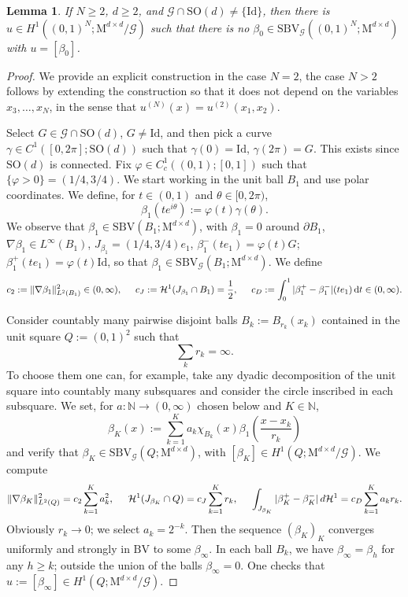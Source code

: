 \documentclass[a4paper,reqno]{amsart}
\newcommand\N{\mathbb{N}}
\newcommand{\BV}{\mathrm{BV}}
\newcommand{\SBV}{\mathrm{SBV}}
\newcommand{\SBVG}{\mathrm{SBV}_{\mathcal{G}}}
\newcommand\calH{\mathcal{H}}
\newcommand\Id{{\mathrm{Id}}}
\newcommand\SO{{\mathrm{SO}}}
\newcommand\dt{{\,\mathrm{d}t}}
\newtheorem{lemma}[definition]{Lemma}
\theoremstyle{remark}
\newcommand{\G}{\mathcal{G}}
\newcommand{\SOn}{\mathrm{SO}(d)}
\newcommand{\Mno}{\mathrm{M}^{d\times d}}
\numberwithin{equation}{section}
\begin{document}
\begin{lemma}\label{le:contres}
	If $N\ge2$, $d\ge2$, and $\G\cap\SOn\ne\{\Id\}$, then there is $u\in H^1((0,1)^N;\Mno/\G)$ such that
	there is no $\beta_0\in \SBVG((0,1)^N;\Mno)$ with $u=[\beta_0]$.
\end{lemma}
\begin{proof}
	We provide an explicit construction in the case $N=2$, the case $N>2$ follows by extending the construction so that it does not depend on the variables $x_3,\dots, x_N$, in the sense that $u^{(N)}(x)=u^{(2)}(x_1,x_2)$.
	
	Select $G\in\G\cap\SOn$, $G\ne\Id$, and then
	pick a curve $\gamma\in C^1([0,2\pi];\SO(d))$ such that
	$\gamma(0)=\Id$, $\gamma(2\pi)=G$. This exists since $\SO(d)$ is connected.
	Fix $\varphi\in C^1_c((0,1);[0,1])$ such that $\{\varphi>0\}=(1/4,3/4)$.
We start working in the unit ball $B_1$ and use polar coordinates. We define,
for $t\in (0,1)$ and $\theta\in [0,2\pi)$,
	\begin{equation*}
	\beta_{1}(t e^{i\theta}) :=
\varphi(t) \gamma (\theta).
	\end{equation*}
	We observe that $\beta_{1}\in \SBV(B_1;\Mno)$, 
	with $\beta_1=0$ around $\partial B_1$, $\nabla \beta_1\in L^\infty(B_1)$,
	$J_{\beta_1}=(1/4,3/4)e_1$,
	$\beta_1^-(te_1)=\varphi(t)G$; $\beta_1^+(te_1)=\varphi(t)\Id$, so that
	$\beta_1\in \SBVG(B_1;\Mno)$.
	We define
	\begin{equation*}
		c_2:=\|\nabla \beta_1\|_{L^2(B_1)}^2\in (0,\infty), 
		\hskip5mm
		c_J:=\calH^1(J_{\beta_1}\cap B_1)=\frac 12,
		\hskip5mm
		c_D:=\int_0^1 |\beta_1^+-\beta_1^-|(te_1) \dt\in (0,\infty).
	\end{equation*}
	 
	Consider countably many pairwise disjoint balls 
	$B_k:=B_{r_k}(x_k)$ contained in the unit square $Q:=(0,1)^2$ such that
	\begin{equation*}
		\sum_k r_k=\infty.
	\end{equation*}
	To choose them one can, for example, take any dyadic decomposition of the unit square into countably many subsquares and consider the circle inscribed in each subsquare.
	We set, for $a:\N\to(0,\infty)$ chosen below and $K\in\N$,
	\begin{equation*}
		\beta_K(x):=
		\sum_{k=1}^K a_k \chi_{B_k}(x) \beta_1 \left( \frac{x-x_k}{r_k}\right)
	\end{equation*}
	and verify that $\beta_K\in \SBVG(Q;\Mno)$,
	with $[\beta_K]\in H^1(Q;\Mno/\G)$.
	We compute
	\begin{equation*}
		\|\nabla \beta_K\|_{L^2(Q)}^2
		=c_2\sum_{k=1}^K a_k^2  ,
		\hskip5mm
		\calH^1(J_{\beta_K}\cap Q)
		=c_J\sum_{k=1}^K r_k ,
		\hskip5mm
    \int_{J_{\beta_K}} |\beta_K^+-\beta_K^-| \, d\calH^1
		=c_D\sum_{k=1}^K a_k r_k .
	\end{equation*}
	Obviously $r_k\to0$; we select $a_k=2^{-k}$. Then
	the sequence $(\beta_K)_K$ converges uniformly and strongly in $\BV$ to some $\beta_\infty$.
	In each ball $B_k$, we have $\beta_\infty=\beta_h$ for any $h\ge k$; outside the union of the balls $\beta_\infty=0$.
	One checks that $ u:=[\beta_\infty] \in H^1(Q;\Mno/\G)$.
	

\end{proof}
\end{document}
